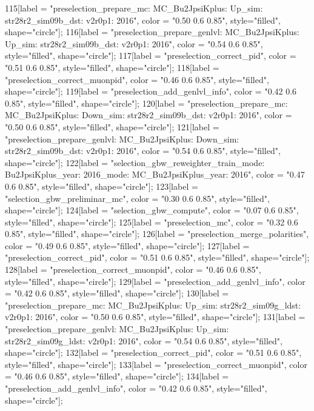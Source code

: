 {	115[label = "preselection_prepare_mc\nmode: MC_Bu2JpsiKplus\npolarity: Up\nstrip_sim: str28r2_sim09b_dst\nversion: v2r0p1\nyear: 2016", color = "0.50 0.6 0.85", style="filled", shape="circle"];
	116[label = "preselection_prepare_genlvl\nmode: MC_Bu2JpsiKplus\npolarity: Up\nstrip_sim: str28r2_sim09b_dst\nversion: v2r0p1\nyear: 2016", color = "0.54 0.6 0.85", style="filled", shape="circle"];
	117[label = "preselection_correct_pid", color = "0.51 0.6 0.85", style="filled", shape="circle"];
	118[label = "preselection_correct_muonpid", color = "0.46 0.6 0.85", style="filled", shape="circle"];
	119[label = "preselection_add_genlvl_info", color = "0.42 0.6 0.85", style="filled", shape="circle"];
	120[label = "preselection_prepare_mc\nmode: MC_Bu2JpsiKplus\npolarity: Down\nstrip_sim: str28r2_sim09b_dst\nversion: v2r0p1\nyear: 2016", color = "0.50 0.6 0.85", style="filled", shape="circle"];
	121[label = "preselection_prepare_genlvl\nmode: MC_Bu2JpsiKplus\npolarity: Down\nstrip_sim: str28r2_sim09b_dst\nversion: v2r0p1\nyear: 2016", color = "0.54 0.6 0.85", style="filled", shape="circle"];
	122[label = "selection_gbw_reweighter_train\ndata_mode: Bu2JpsiKplus\ndata_year: 2016\nmc_mode: MC_Bu2JpsiKplus\nmc_year: 2016", color = "0.47 0.6 0.85", style="filled", shape="circle"];
	123[label = "selection_gbw_preliminar_mc", color = "0.30 0.6 0.85", style="filled", shape="circle"];
	124[label = "selection_gbw_compute", color = "0.07 0.6 0.85", style="filled", shape="circle"];
	125[label = "preselection_mc", color = "0.32 0.6 0.85", style="filled", shape="circle"];
	126[label = "preselection_merge_polarities", color = "0.49 0.6 0.85", style="filled", shape="circle"];
	127[label = "preselection_correct_pid", color = "0.51 0.6 0.85", style="filled", shape="circle"];
	128[label = "preselection_correct_muonpid", color = "0.46 0.6 0.85", style="filled", shape="circle"];
	129[label = "preselection_add_genlvl_info", color = "0.42 0.6 0.85", style="filled", shape="circle"];
	130[label = "preselection_prepare_mc\nmode: MC_Bu2JpsiKplus\npolarity: Up\nstrip_sim: str28r2_sim09g_ldst\nversion: v2r0p1\nyear: 2016", color = "0.50 0.6 0.85", style="filled", shape="circle"];
	131[label = "preselection_prepare_genlvl\nmode: MC_Bu2JpsiKplus\npolarity: Up\nstrip_sim: str28r2_sim09g_ldst\nversion: v2r0p1\nyear: 2016", color = "0.54 0.6 0.85", style="filled", shape="circle"];
	132[label = "preselection_correct_pid", color = "0.51 0.6 0.85", style="filled", shape="circle"];
	133[label = "preselection_correct_muonpid", color = "0.46 0.6 0.85", style="filled", shape="circle"];
	134[label = "preselection_add_genlvl_info", color = "0.42 0.6 0.85", style="filled", shape="circle"];
}
